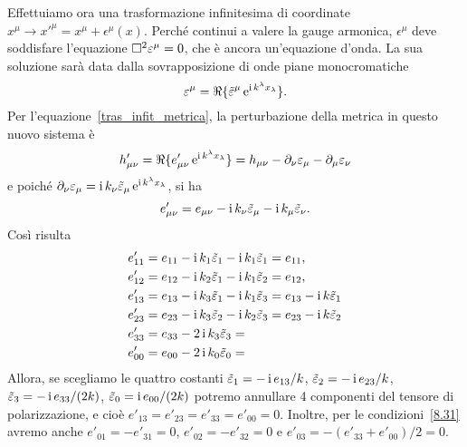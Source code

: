 Effettuiamo ora una trasformazione infinitesima di coordinate $x^{\mu} \to
x'^{\mu} = x^{\mu} + \epsilon^{\mu}(x)$.  Perché continui a valere la gauge
armonica, $\epsilon^{\mu}$ deve soddisfare l'equazione $\Box^{2} \varepsilon^{\mu} =
0$, che è ancora un'equazione d'onda.  La sua soluzione sarà data dalla
sovrapposizione di onde piane monocromatiche
\begin{equation}
  \varepsilon^{\mu} = \Re\{\tilde{\varepsilon}^{\mu}\operatorname{\mathrm{e}}^{\operatorname{\mathrm{i}}
    k^{\lambda}x_{\lambda}}\}.
\end{equation}
Per l'equazione~\eqref{tras_infit_metrica}, la perturbazione della metrica in
questo nuovo sistema è
\begin{equation}
  h'_{\mu\nu} = \Re\{e'_{\mu\nu} \operatorname{\mathrm{e}}^{\operatorname{\mathrm{i}} k^{\lambda}x_{\lambda}}\} =
  h_{\mu\nu} - \partial_{\nu}\varepsilon_{\mu} - \partial_{\mu}\varepsilon_{\nu}
\end{equation}
e poiché $\partial_{\nu}\varepsilon_{\mu} = \operatorname{\mathrm{i}} k_{\nu}\tilde{\varepsilon}_{\mu}
\operatorname{\mathrm{e}}^{\operatorname{\mathrm{i}} k^{\lambda}x_{\lambda}}$, si ha
\begin{equation}
  e'_{\mu\nu} = e_{\mu\nu} - \operatorname{\mathrm{i}} k_{\nu}\tilde{\varepsilon}_{\mu} - \operatorname{\mathrm{i}}
  k_{\mu}\tilde{\varepsilon}_{\nu}.
\end{equation}
Così risulta
\begin{subequations}
  \begin{align}
    e'_{11} &= e_{11} - \operatorname{\mathrm{i}} k_{1} \tilde{\varepsilon}_{1} - \operatorname{\mathrm{i}}
    k_{1}\tilde{\varepsilon}_{1} = e_{11}, \\
    e'_{12} &= e_{12} - \operatorname{\mathrm{i}} k_{2}\tilde{\varepsilon}_{1} - \operatorname{\mathrm{i}}
    k_{1}\tilde{\varepsilon}_{2} = e_{12}, \\
    e'_{13} &= e_{13} - \operatorname{\mathrm{i}} k_{3}\tilde{\varepsilon}_{1} - \operatorname{\mathrm{i}}
    k_{1}\tilde{\varepsilon}_{3} = e_{13} - \operatorname{\mathrm{i}} k\tilde{\varepsilon}_{1}  \\
    e'_{23} &= e_{23} - \operatorname{\mathrm{i}} k_{3}\tilde{\varepsilon}_{2} - \operatorname{\mathrm{i}}
    k_{2}\tilde{\varepsilon}_{3} = e_{23} - \operatorname{\mathrm{i}} k\tilde{\varepsilon}_{2}  \\
    e'_{33} &= e_{33} - 2\operatorname{\mathrm{i}} k_{3}\tilde{\varepsilon}_{3} = \\
    e'_{00} &= e_{00} - 2\operatorname{\mathrm{i}} k_{0}\tilde{\varepsilon}_{0} =
  \end{align}
\end{subequations}
Allora, se scegliamo le quattro costanti
$\tilde{\varepsilon}_{1} = -\operatorname{\mathrm{i}} e_{13}/k$,
$\tilde{\varepsilon}_{2} = -\operatorname{\mathrm{i}} e_{23}/k$,
$\tilde{\varepsilon}_{3} = -\operatorname{\mathrm{i}} e_{33}/(2k)$,
$\tilde{\varepsilon}_{0} = \operatorname{\mathrm{i}} e_{00}/(2k)$
potremo annullare 4 componenti del tensore di polarizzazione, e cioè
$e'_{13} =  e'_{23} = e'_{33} = e'_{00} = 0$.
Inoltre, per le condizioni~\eqref{8.31} avremo anche
$e'_{01} = -e'_{31} = 0$, $e'_{02} = -e'_{32} = 0$ e
$e'_{03} = -(e'_{33}+e'_{00})/2 = 0$.

